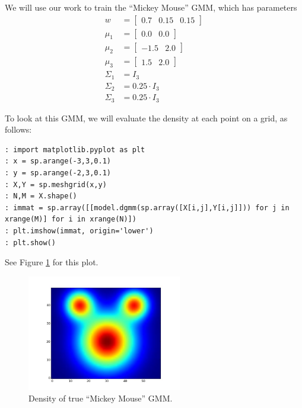 We will use our work to train the ``Mickey Mouse'' GMM, which has parameters
\begin{align*}
w & = \left[ \begin{array}{ccc} 0.7 & 0.15 & 0.15 \end{array} \right] \\
\mu_{1} & = \left[ \begin{array}{cc} 0.0 & 0.0 \end{array} \right] \\
\mu_{2} & = \left[ \begin{array}{cc} -1.5 & 2.0 \end{array} \right] \\
\mu_{3} & = \left[ \begin{array}{cc} 1.5 & 2.0 \end{array} \right] \\
\Sigma_{1} & = I_{3} \\
\Sigma_{2} & = 0.25 \cdot I_{3} \\
\Sigma_{3} & = 0.25 \cdot I_{3}
\end{align*}

To look at this GMM, we will evaluate the density at each point on a grid, as follows:

\begin{lstlisting}[style=python]
: import matplotlib.pyplot as plt
: x = sp.arange(-3,3,0.1)
: y = sp.arange(-2,3,0.1)
: X,Y = sp.meshgrid(x,y)
: N,M = X.shape()
: immat = sp.array([[model.dgmm(sp.array([X[i,j],Y[i,j]])) for j in xrange(M)] for i in xrange(N)])
: plt.imshow(immat, origin='lower')
: plt.show()
\end{lstlisting}

See Figure \ref{mickeygmm} for this plot.

\begin{figure}[h]
\centering
\includegraphics[height=2in]{truemickeygmm.jpeg}
\caption{Density of true ``Mickey Mouse'' GMM.}\label{mickeygmm}
\end{figure}

